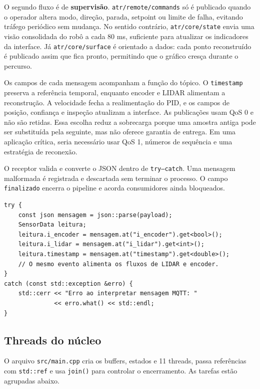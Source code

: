 \documentclass[12pt,a4paper]{article}
\begin{document}
O segundo fluxo é de \textbf{supervisão}. \texttt{atr/remote/commands} só é publicado quando o operador altera modo, direção, parada, setpoint ou limite de falha, evitando tráfego periódico sem mudança. No sentido contrário, \texttt{atr/core/state} envia uma visão consolidada do robô a cada 80 ms, suficiente para atualizar os indicadores da interface. Já \texttt{atr/core/surface} é orientado a dados: cada ponto reconstruído é publicado assim que fica pronto, permitindo que o gráfico cresça durante o percurso.

Os campos de cada mensagem acompanham a função do tópico. O \texttt{timestamp} preserva a referência temporal, enquanto encoder e LIDAR alimentam a reconstrução. A velocidade fecha a realimentação do PID, e os campos de posição, confiança e inspeção atualizam a interface. As publicações usam QoS 0 e não são retidas. Essa escolha reduz a sobrecarga porque uma amostra antiga pode ser substituída pela seguinte, mas não oferece garantia de entrega. Em uma aplicação crítica, seria necessário usar QoS 1, números de sequência e uma estratégia de reconexão.

O receptor valida e converte o JSON dentro de \texttt{try--catch}. Uma mensagem malformada é registrada e descartada sem terminar o processo. O campo \texttt{finalizado} encerra o pipeline e acorda consumidores ainda bloqueados.

\begin{lstlisting}[style=cppstyle,caption={Conversão do payload MQTT em dados internos.}]
try {
    const json mensagem = json::parse(payload);
    SensorData leitura;
    leitura.i_encoder = mensagem.at("i_encoder").get<bool>();
    leitura.i_lidar = mensagem.at("i_lidar").get<int>();
    leitura.timestamp = mensagem.at("timestamp").get<double>();
    // O mesmo evento alimenta os fluxos de LIDAR e encoder.
}
catch (const std::exception &erro) {
    std::cerr << "Erro ao interpretar mensagem MQTT: "
              << erro.what() << std::endl;
}
\end{lstlisting}

\subsection{Threads do núcleo}

O arquivo \texttt{src/main.cpp} cria os buffers, estados e 11 threads, passa referências com \texttt{std::ref} e usa \texttt{join()} para controlar o encerramento. As tarefas estão agrupadas abaixo.
\end{document}
